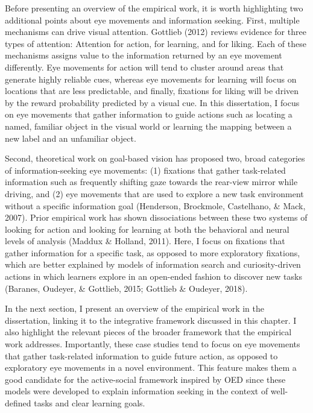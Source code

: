 \documentclass[oneside]{report}
\begin{document}
Before presenting an overview of the empirical work, it is worth
highlighting two additional points about eye movements and information
seeking. First, multiple mechanisms can drive visual attention. Gottlieb
(2012) reviews evidence for three types of attention: Attention for
action, for learning, and for liking. Each of these mechanisms assigns
value to the information returned by an eye movement differently. Eye
movements for action will tend to cluster around areas that generate
highly reliable cues, whereas eye movements for learning will focus on
locations that are less predictable, and finally, fixations for liking
will be driven by the reward probability predicted by a visual cue. In
this dissertation, I focus on eye movements that gather information to
guide actions such as locating a named, familiar object in the visual
world or learning the mapping between a new label and an unfamiliar
object.

Second, theoretical work on goal-based vision has proposed two, broad
categories of information-seeking eye movements: (1) fixations that
gather task-related information such as frequently shifting gaze towards
the rear-view mirror while driving, and (2) eye movements that are used
to explore a new task environment without a specific information goal
(Henderson, Brockmole, Castelhano, \& Mack, 2007). Prior empirical work
has shown dissociations between these two systems of looking for action
and looking for learning at both the behavioral and neural levels of
analysis (Maddux \& Holland, 2011). Here, I focus on fixations that
gather information for a specific task, as opposed to more exploratory
fixations, which are better explained by models of information search
and curiosity-driven actions in which learners explore in an open-ended
fashion to discover new tasks (Baranes, Oudeyer, \& Gottlieb, 2015;
Gottlieb \& Oudeyer, 2018).

In the next section, I present an overview of the empirical work in the
dissertation, linking it to the integrative framework discussed in this
chapter. I also highlight the relevant pieces of the broader framework
that the empirical work addresses. Importantly, these case studies tend
to focus on eye movements that gather task-related information to guide
future action, as opposed to exploratory eye movements in a novel
environment. This feature makes them a good candidate for the
active-social framework inspired by OED since these models were
developed to explain information seeking in the context of well-defined
tasks and clear learning goals.
\end{document}
